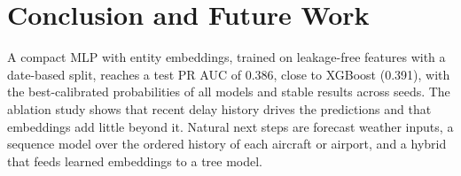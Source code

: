 \documentclass[conference]{IEEEtran}
\begin{document}
\section{Conclusion and Future Work}
A compact MLP with entity embeddings, trained on leakage-free features with a date-based split, reaches a test PR
AUC of 0.386, close to XGBoost (0.391), with the best-calibrated probabilities of all models and stable results
across seeds. The ablation study shows that recent delay history drives the predictions and that embeddings add
little beyond it. Natural next steps are forecast weather inputs, a sequence model over the ordered history of each
aircraft or airport, and a hybrid that feeds learned embeddings to a tree model.



\end{document}
